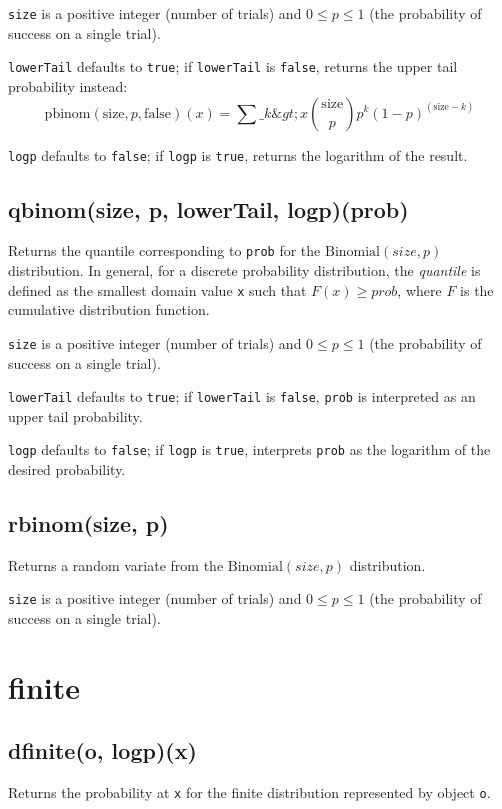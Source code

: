 \documentclass{article}
\begin{document}
\texttt{size} is a positive integer (number of trials) and $0 \leq p \leq 1$
(the probability of success on a single trial).


\texttt{lowerTail} defaults to \texttt{true}; if \texttt{lowerTail} is \texttt{false}, returns
the upper tail probability instead:
$$\textrm{pbinom}(\textrm{size}, p, \textrm{false})(x) = \sum\_{k\&gt;x} \binom{\textrm{size}}{p}p^{k}(1-p)^{(\textrm{size}-k)}$$


\texttt{logp} defaults to \texttt{false}; if \texttt{logp} is \texttt{true}, returns the logarithm
of the result.


    \subsection*{qbinom(size, p, lowerTail, logp)(prob)}
    Returns the quantile corresponding to \texttt{prob}
for the $\textrm{Binomial}(size, p)$ distribution.
In general, for a discrete probability
distribution, the \emph{quantile} is defined as the smallest domain value
\texttt{x} such that $F(x) \geq prob$, where $F$ is the cumulative
distribution function.


\texttt{size} is a positive integer (number of trials) and $0 \leq p \leq 1$
(the probability of success on a single trial).


\texttt{lowerTail} defaults to \texttt{true}; if \texttt{lowerTail} is \texttt{false}, \texttt{prob} is
interpreted as an upper tail probability.


\texttt{logp} defaults to \texttt{false}; if \texttt{logp} is \texttt{true}, interprets \texttt{prob} as
the logarithm of the desired probability.


    \subsection*{rbinom(size, p)}
    Returns a random variate from the $\textrm{Binomial}(size, p)$ distribution.


\texttt{size} is a positive integer (number of trials) and $0 \leq p \leq 1$
(the probability of success on a single trial).


  \section{finite}
    \subsection*{dfinite(o, logp)(x)}
    Returns the probability at \texttt{x} for the finite distribution
represented by object \texttt{o}.
\end{document}
